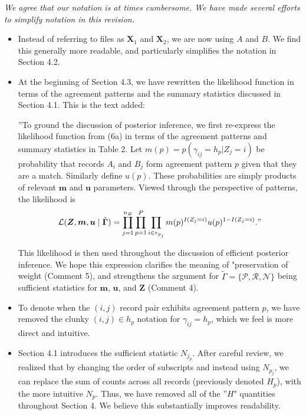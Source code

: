 \documentclass[letterpaper, parskip]{scrartcl}
\newcounter{responsectr}[section]     %
\newcommand{\reply}[1]{%
	\refstepcounter{responsectr}%
		\begin{tcolorbox}
			\itshape #1
		\end{tcolorbox}
}
\begin{document}
\reply{We agree that our notation is at times cumbersome. We have made several efforts to simplify notation in this revision.

\begin{itemize}
	\item Instead of referring to files as $\mathbf{X}_1$ and $\mathbf{X}_2$, we are now using $A$ and $B$. We find this generally more readable, and particularly simplifies the notation in Section 4.2. 
	\item At the beginning of Section 4.3, we have rewritten the likelihood function in terms of the agreement patterns and the summary statistics discussed in Section 4.1. This is the text added:
	
''To ground the discussion of posterior inference, we first re-express the likelihood function from (6a) in terms of the agreement patterns and summary statistics in Table 2. Let $m(p) =  p(\gamma_{ij} = h_p|Z_j = i)$ be probability that records $A_i$ and $B_j$ form agreement pattern $p$ given that they are a match. Similarly define $u(p)$. These probabilities are simply products of relevant $\bm{m}$ and $\bm{u}$ parameters. Viewed through the perspective of patterns, the likelihood is
\begin{align}
	\mathcal{L}(\bm{Z}, \bm{m}, \bm{u} \mid \tilde{\bm{\Gamma}}) = \prod_{j=1}^{n_B}\prod_{p=1}^P \prod_{i \in r_{p_j}} m(p)^{I(Z_j = i)}u(p)^{1 - I(Z_j = i)}. \label{likelihood_efficient}"
\end{align}
	
	This likelihood is then used throughout the discussion of efficient posterior inference. We hope this expression clarifies the meaning of "preservation of weight (Comment 5), and strengthens the argument for $\tilde{\Gamma} = \{\mathcal{P}, \mathcal{R}, \mathcal{N} \}$ being sufficient statistics for $\bm{m}$, $\bm{u}$, and $\bm{Z}$ (Comment 4). 
	
	\item To denote when the $(i,j)$ record pair exhibits agreement pattern $p$, we have removed the clunky $(i, j) \in h_p$ notation for $\gamma_{ij} = h_p$, which we feel is more direct and intuitive.
	
	\item Section 4.1 introduces the sufficient statistic $N_{j_p}$. After careful review, we realized that by changing the order of subscripts and instead using $N_{p_j}$, we can replace the sum of counts across all records (previously denoted $H_p$), with the more intuitive $N_p$. Thus, we have removed all of the ''$H$" quantities throughout Section 4. We believe this substantially improves readability.  
\end{itemize}
}
\end{document}
